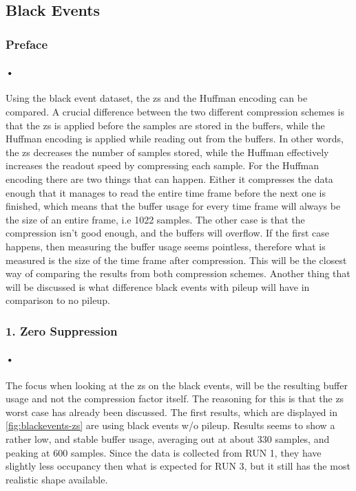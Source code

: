 \documentclass[a4paper, 12pt]{report}\dfrac{\right }{•}
\begin{document}
\subsection{Black Events}

\subsubsection{Preface}
\paragraph{•}
Using the black event dataset, the \gls{zs} and the Huffman encoding can be compared.
A crucial difference between the two different compression schemes is that the \gls{zs} is applied before the samples are stored in the buffers, while the Huffman encoding is applied while reading out from the buffers.
In other words, the \gls{zs} decreases the number of samples stored, while the Huffman effectively increases the readout speed by compressing each sample.
For the Huffman encoding there are two things that can happen.
Either it compresses the data enough that it manages to read the entire time frame before the next one is finished, which means that the buffer usage for every time frame will always be the size of an entire frame, i.e 1022 samples.
The other case is that the compression isn't good enough, and the buffers will overflow.
If the first case happens, then measuring the buffer usage seems pointless, therefore what is measured is the size of the time frame after compression.
This will be the closest way of comparing the results from both compression schemes.
Another thing that will be discussed is what difference black events with pileup will have in comparison to no pileup.


\subsubsection{1. Zero Suppression}

\paragraph{•}
The focus when looking at the \gls{zs} on the black events, will be the resulting buffer usage and not the compression factor itself.
The reasoning for this is that the \gls{zs} worst case has already been discussed.
The first results, which are displayed in \ref{fig:blackevents-zs} are using black events w/o pileup.
Results seems to show a rather low, and stable buffer usage, averaging out at about 330 samples, and peaking at 600 samples.
Since the data is collected from RUN 1, they have slightly less occupancy then what is expected for RUN 3, but it still has the most realistic shape available.
\end{document}
